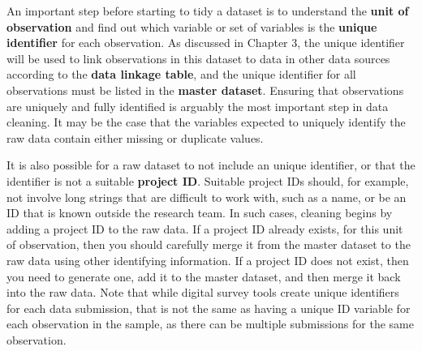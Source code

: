 An important step before starting to tidy a dataset is
to understand the \textbf{unit of observation}
and find out which variable or set of variables is the \textbf{unique identifier}
for each observation.
As discussed in Chapter 3,
the unique identifier will be used to link observations in this dataset
to data in other data sources according to the \textbf{data linkage table},
and the unique identifier for all observations
must be listed in the \textbf{master dataset}.
Ensuring that observations are uniquely and fully identified
is arguably the most important step in data cleaning.
It may be the case that the variables expected to uniquely identify
the raw data contain either missing or duplicate values.

It is also possible for a raw dataset to not include an unique identifier,
or that the identifier is not a suitable \textbf{project ID}.
Suitable project IDs should, for example, not involve long strings
that are difficult to work with, such as a name,
or be an ID that is known outside the research team.
In such cases, cleaning begins by
adding a project ID to the raw data.
If a project ID already exists,
for this unit of observation,
then you should carefully merge it
from the master dataset
to the raw data
using other identifying information.
If a project ID does not exist,
then you need to generate one,
add it to the master dataset,
and then merge it back into the raw data.
Note that while digital survey tools create
unique identifiers for each data submission,
that is not the same as having a unique ID variable
for each observation in the sample,
as there can be multiple submissions
for the same observation.


